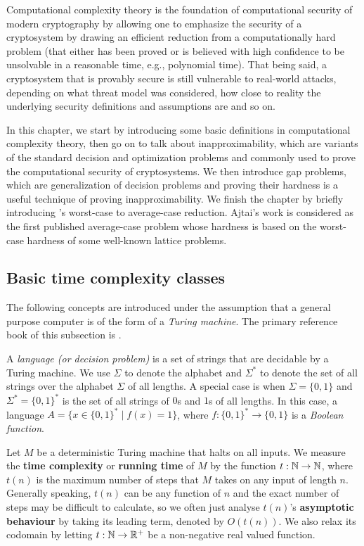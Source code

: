 \documentclass[../main.tex]{subfiles}
\begin{document}
Computational complexity theory is the foundation of computational security of modern cryptography by allowing one to emphasize the security of a cryptosystem by drawing an efficient reduction from a computationally hard problem (that either has been proved or is believed with high confidence to be unsolvable in a reasonable time, e.g., polynomial time). That being said, a cryptosystem that is provably secure is still vulnerable to real-world attacks, depending on what threat model was considered, how close to reality the underlying security definitions and assumptions are and so on. 

In this chapter, we start by introducing some basic definitions in computational complexity theory, then go on to talk about inapproximability, which are variants of the standard decision and optimization problems and commonly used to prove the computational security of cryptosystems. We then introduce gap problems, which are generalization of decision problems and proving their hardness is a useful technique of proving inapproximability. We finish the chapter by briefly introducing \citet{ajtai1996generating}'s worst-case to average-case reduction. Ajtai's work is considered as the first published average-case problem whose hardness is based on the worst-case hardness of some well-known lattice problems.

\subsection{Basic time complexity classes}

The following concepts are introduced under the assumption that a general purpose computer is of the form of a \textit{Turing machine}. The primary reference book of this subsection is \cite{sipser2013introduction}. 

A \textit{language (or decision problem)} 
\reversemarginpar
{}
is a set of strings that are decidable by a Turing machine. We use $\Sigma$ to denote the alphabet and $\Sigma^*$ to denote the set of all strings over the alphabet $\Sigma$ of all lengths. A special case is when $\Sigma=\{0,1\}$ and $\Sigma^*=\{0,1\}^*$ is the set of all strings of $0$s and $1$s of all lengths. In this case, a language $A=\{x \in \{0,1\}^* \mid f(x)=1\}$, where $f:\{0,1\}^* \rightarrow \{0,1\}$ is a \textit{Boolean function}.

Let $M$ be a deterministic Turing machine that halts on all inputs. We measure the 
\reversemarginpar
{}
\textbf{time complexity} or \textbf{running time} of $M$ by the function $t:\mathbb{N} \rightarrow \mathbb{N}$, where $t(n)$ is the maximum number of steps that $M$ takes on any input of length $n$. Generally speaking, $t(n)$ can be any function of $n$ and the exact number of steps may be difficult to calculate, so we often just analyse $t(n)$'s \textbf{asymptotic behaviour} by taking its leading term, denoted by $O(t(n))$. We also relax its codomain by letting $t:\mathbb{N} \rightarrow \mathbb{R}^+$ be a non-negative real valued function. 
\end{document}
